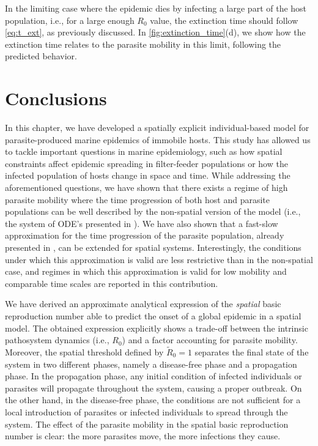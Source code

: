 In the limiting case where the epidemic dies by infecting a large part of
the host population, i.e., for a large enough $R_0$ value, the extinction time
should follow \cref{eq:t_ext}, as previously discussed. In
\cref{fig:extinction_time}(d), we show how the extinction time relates to the
parasite mobility in this limit, following the predicted behavior.

\section{Conclusions} \label{sec: conclusions}

In this chapter, we have developed a spatially explicit individual-based model
for parasite-produced marine epidemics of immobile hosts. This study has
allowed us to tackle important questions in marine epidemiology, such as how
spatial constraints affect epidemic spreading in filter-feeder populations or
how the infected population of hosts change in space and time. While
addressing the aforementioned questions, we have shown that there exists a
regime of high parasite mobility where the time progression of both host and
parasite populations can be well described by the non-spatial version of the
model (i.e., the system of ODE's presented in \cite{GimenezRomero2021}). We
have also shown that a fast-slow approximation for the time progression of the
parasite population, already presented in \cite{GimenezRomero2021}, can be
extended for spatial systems. Interestingly, the conditions under which this
approximation is valid	are less restrictive than in the non-spatial case, and
regimes in which this approximation is valid for low mobility and comparable
time scales are reported in this contribution.

We have derived an approximate analytical expression of the
\textit{spatial} basic reproduction number able to predict the onset of
a global epidemic in a spatial model. The obtained expression explicitly shows
a trade-off between the intrinsic pathosystem dynamics (i.e., $R_0$) and a
factor accounting for parasite mobility. Moreover, the spatial threshold
defined by $\tilde{R}_0=1$ separates the final state of the system in two
different phases, namely a disease-free phase and a propagation phase. In the
propagation phase, any initial condition of infected individuals or parasites
will propagate throughout the system, causing a proper outbreak. On the other
hand, in the disease-free phase, the conditions are not sufficient for a local
introduction of parasites or infected individuals to spread through the system.
The effect of the parasite mobility in the spatial basic reproduction number is
clear: the more parasites move, the more infections they cause.

